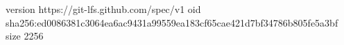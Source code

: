 version https://git-lfs.github.com/spec/v1
oid sha256:ed0086381c3064ea6ac9431a99559ea183cf65cae421d7bf34786b805fe5a3bf
size 2256
